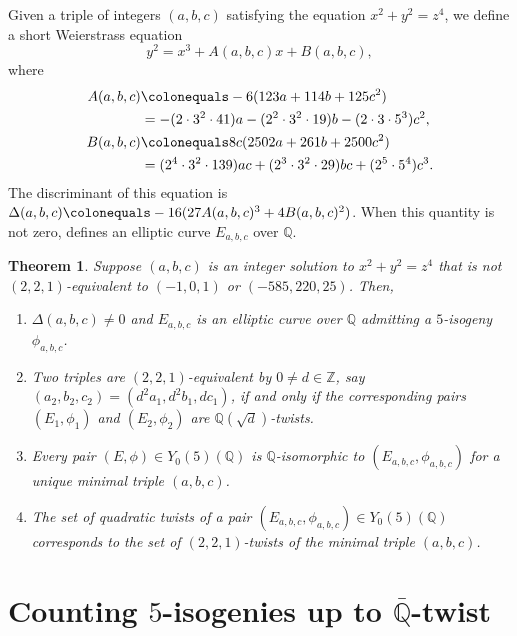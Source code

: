 \documentclass[12pt]{amsart}
\newcounter{counter}[section] %
\numberwithin{equation}{section} %
\newtheorem{theorem}[counter]{Theorem}
\theoremstyle{definition} \newtheorem{definition}[counter]{Definition}
\theoremstyle{remark} \newtheorem{nonexam}[counter]{Non-example}
\newcommand{\ZZ}{\mathbb{Z}} %
\newcommand{\QQ}{\mathbb{Q}} %
\newcommand{\Qbar}{\bar{\QQ}} %
\begin{document}
Given a triple of integers $(a,b,c)$ satisfying the equation $x^2 +
y^2 = z^4$, we define a short Weierstrass equation
\begin{equation}
  \label{eq:Eabc}
  y^2 = x^3 + A(a,b,c)x + B(a,b,c),
\end{equation}
where
\begin{align}
  \label{eq:A}
  A(a,b,c) &\colonequals -6(123a + 114b + 125c^2) \\
  &= -(2\cdot 3^2\cdot 41)a - (2^2\cdot 3^2 \cdot 19)b - (2\cdot 3\cdot 5^3)c^2, \notag\\
  \label{eq:B}
  B(a,b,c) &\colonequals 8c(2502a + 261b + 2500c^2) \\
  &= (2^4\cdot 3^2\cdot 139)ac + (2^3\cdot 3^2\cdot 29)bc + (2^5\cdot 5^4)c^3. \notag
\end{align}
The discriminant of this equation is $\Delta(a,b,c) \colonequals
-16(27A(a,b,c)^3 + 4B(a,b,c)^2)$. When this quantity is not zero,
 defines an elliptic curve $E_{a,b,c}$ over $\QQ$.

\begin{theorem}
  \label{thm:Eabc}
  Suppose $(a,b,c)$ is an integer solution to $x^2 + y^2 = z^4$ that is not
  $(2,2,1)$-equivalent to $(-1,0,1)$ or $(-585,220,25)$. Then,
  \begin{enumerate}[label=(\alph*)]
      \item $\Delta(a,b,c)
  \neq 0$ and $E_{a,b,c}$ is an elliptic curve over $\QQ$
  admitting a $5$-isogeny $\phi_{a,b,c}$.
      \item Two triples are $(2,2,1)$-equivalent by $0 \neq d\in \ZZ$, say
  $(a_2,b_2,c_2) = (d^2a_1,d^2b_1,dc_1)$, if and only if the corresponding
  pairs $(E_1,\phi_1)$ and $(E_2,\phi_2)$ are $\QQ(\sqrt{d})$-twists.
      \item Every pair $(E,\phi) \in Y_0(5)(\QQ)$ is $\QQ$-isomorphic to
  $(E_{a,b,c},\phi_{a,b,c})$ for a unique minimal triple $(a,b,c)$.
      \item The set of quadratic twists of a pair $(E_{a,b,c},\phi_{a,b,c}) \in
        Y_0(5)(\QQ)$ corresponds to the set of $(2,2,1)$-twists of the minimal
        triple $(a,b,c)$.
  \end{enumerate}
\end{theorem}

\section{Counting $5$-isogenies up to $\Qbar$-twist}
\label{sec:counting-5-isogenies-twist}
\end{document}
